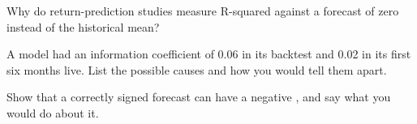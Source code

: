 \begin{interviewq}\label{iq:ml:why-financial-machine-learning-is-different:4}
Why do return-prediction studies measure R-squared against a forecast of zero instead of the historical mean?
\end{interviewq}

\begin{interviewq}\label{iq:ml:why-financial-machine-learning-is-different:5}
A model had an information coefficient of 0.06 in its backtest and 0.02 in its first six months live. List the
possible causes and how you would tell them apart.
\end{interviewq}

\begin{interviewq}\label{iq:ml:why-financial-machine-learning-is-different:6}
Show that a correctly signed forecast can have a negative , and say what you would do about it.
\end{interviewq}
